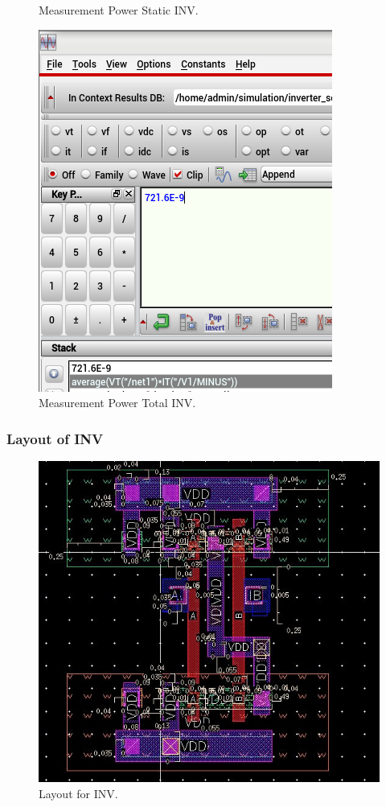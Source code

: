 \begin{figure}[H]
\begin{minipage}{0.5\linewidth}
		\caption{Measurement Power Static INV.}
	\end{minipage}
	\begin{minipage}{0.5\linewidth}
		\includegraphics[width=\linewidth]{section/EX1/INV/EX1_INV_Power_Total.png}
		\caption{Measurement Power Total INV.}
	\end{minipage}
\end{figure}

\subsubsection{Layout of INV}

\begin{figure}[H]
	\centering
	\includegraphics[width=.7\linewidth]{section/EX1/INV/EX1_INV_layout.png}
	\caption{Layout for INV.}
	\label{f_EX1_INV_layout}
\end{figure}

